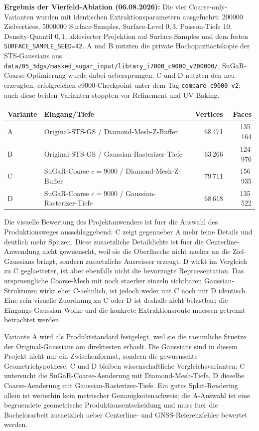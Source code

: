 \documentclass[12pt,a4paper]{article}
\begin{document}
\textbf{Ergebnis der Vierfeld-Ablation (06.08.2026):} Die vier Coarse-only-
Varianten wurden mit identischen Extraktionsparametern ausgefuehrt:
$200000$ Zielvertices, $5000000$ Surface-Samples, Surface-Level $0{,}3$,
Poisson-Tiefe $10$, Density-Quantil $0{,}1$, aktivierter Projektion auf
Surface-Samples und dem festen \texttt{SURFACE\_SAMPLE\_SEED=42}. A und B
nutzten die private Hochopazitaetskopie der
STS-Gaussians aus
\texttt{data/05\_3dgs/masked\_sugar\_input/library\_i7000\_c9000\_v200000/};
SuGaR-Coarse-Optimierung wurde dabei uebersprungen. C und D nutzten den neu
erzeugten, erfolgreichen c9000-Checkpoint unter dem Tag
\texttt{compare\_c9000\_v2}; auch diese beiden Varianten stoppten vor
Refinement und UV-Baking.

\begin{center}
\small
\begin{tabularx}{\textwidth}{Xlrr}
\textbf{Variante} & \textbf{Eingang/Tiefe} & \textbf{Vertices} & \textbf{Faces}\\
\hline
A & Original-STS-GS / Diamond-Mesh-Z-Buffer & 68\,471 & 135\,164\\
B & Original-STS-GS / Gaussian-Rasterizer-Tiefe & 63\,266 & 124\,976\\
C & SuGaR-Coarse $c=9000$ / Diamond-Mesh-Z-Buffer & 79\,711 & 156\,935\\
D & SuGaR-Coarse $c=9000$ / Gaussian-Rasterizer-Tiefe & 68\,618 & 135\,522\\
\end{tabularx}
\end{center}

Die visuelle Bewertung des Projektanwenders ist fuer die Auswahl des
Produktionsweges ausschlaggebend: C zeigt gegenueber A mehr feine Details und
deutlich mehr Spitzen. Diese zusaetzliche Detaildichte ist fuer die
Centerline-Anwendung nicht gewuenscht, weil sie die Oberflaeche nicht naeher an
die Ziel-Gaussians bringt, sondern zusaetzliche Ausreisser erzeugt. D wirkt im
Vergleich zu C geglaetteter, ist aber ebenfalls nicht die bevorzugte
Repraesentation. Das urspruengliche Coarse-Mesh mit noch staerker einzeln
sichtbaren Gaussian-Strukturen wirkt eher C-aehnlich, ist jedoch weder mit C
noch mit D identisch. Eine rein visuelle Zuordnung zu C oder D ist deshalb
nicht belastbar; die Eingangs-Gaussian-Wolke und die konkrete Extraktionsroute
muessen getrennt betrachtet werden.

Variante A wird als Produktstandard festgelegt, weil sie die raeumliche
Stuetze der Original-Gaussians am direktesten erhaelt. Die Gaussians sind in
diesem Projekt nicht nur ein Zwischenformat, sondern die gewuenschte
Geometriehypothese. C und D bleiben wissenschaftliche Vergleichsvarianten:
C untersucht die SuGaR-Coarse-Aenderung mit Diamond-Mesh-Tiefe, D dieselbe
Coarse-Aenderung mit Gaussian-Rasterizer-Tiefe. Ein gutes Splat-Rendering
allein ist weiterhin kein metrischer Genauigkeitsnachweis; die A-Auswahl ist
eine begruendete geometrische Produktionsentscheidung und muss fuer die
Bachelorarbeit zusaetzlich ueber Centerline- und GNSS-Referenzfehler bewertet
werden.
\end{document}
